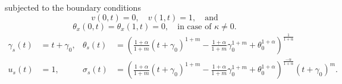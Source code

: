 \documentclass[a4paper,11pt]{article}
\theoremstyle{remark}
\begin{document}
subjected to the boundary conditions
\begin{equation} \label{BCOND1}
 v(0,t)=0, \quad v(1,t)=1, \quad \text{and}
\end{equation}
\begin{equation} \label{BCOND2}
 \theta_x(0,t)=\theta_x(1,t)=0, \quad \text{in case of $\kappa\ne0$.}
\end{equation}
%
\begin{equation} \label{eq:uss}
\begin{aligned}
 \gamma_s(t) &= t+\gamma_0, & \theta_s(t) &= \left(\frac{1+\alpha}{1+m} (t+\gamma_0)^{1+m} - \frac{1+\alpha}{1+m} \gamma_0^{1+m} + \theta_0^{1+\alpha}   \right)^{\frac{1}{1+\alpha}}\\
  u_s(t) &=1, & \sigma_s(t)&=\left(\frac{1+\alpha}{1+m} (t+\gamma_0)^{1+m} - \frac{1+\alpha}{1+m} \gamma_0^{1+m} + \theta_0^{1+\alpha}   \right)^{\frac{-\alpha}{1+\alpha}}(t+\gamma_0)^m.
\end{aligned}
\end{equation}
%
%
%
\end{document}

